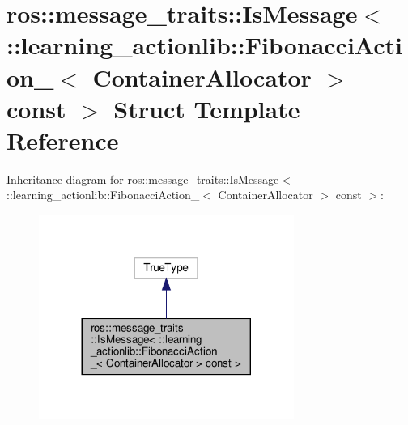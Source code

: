 \hypertarget{structros_1_1message__traits_1_1IsMessage_3_01_1_1learning__actionlib_1_1FibonacciAction___3_01Cc493cf42e5597f05f33d731b96d14cc4}{}\section{ros\+:\+:message\+\_\+traits\+:\+:Is\+Message$<$ \+:\+:learning\+\_\+actionlib\+:\+:Fibonacci\+Action\+\_\+$<$ Container\+Allocator $>$ const $>$ Struct Template Reference}
\label{structros_1_1message__traits_1_1IsMessage_3_01_1_1learning__actionlib_1_1FibonacciAction___3_01Cc493cf42e5597f05f33d731b96d14cc4}


Inheritance diagram for ros\+:\+:message\+\_\+traits\+:\+:Is\+Message$<$ \+:\+:learning\+\_\+actionlib\+:\+:Fibonacci\+Action\+\_\+$<$ Container\+Allocator $>$ const $>$\+:
\nopagebreak
\begin{figure}[H]
\begin{center}
\leavevmode
\includegraphics[width=236pt]{structros_1_1message__traits_1_1IsMessage_3_01_1_1learning__actionlib_1_1FibonacciAction___3_01C4a6a95dabbfe91e37ce5cb6d3c253825}
\end{center}
\end{figure}


